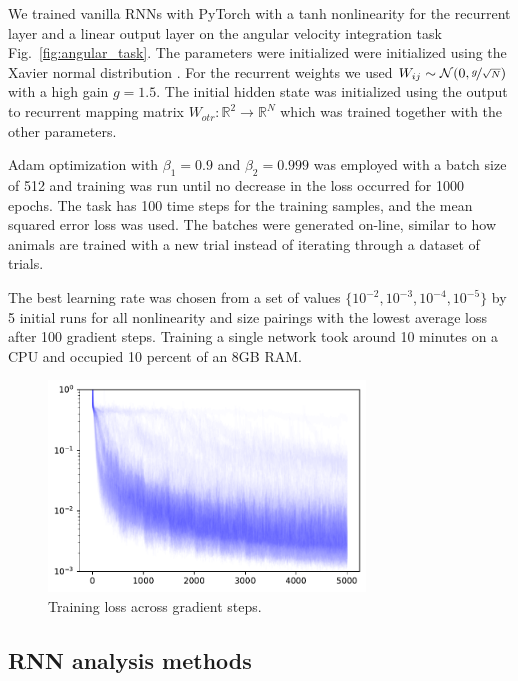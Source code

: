 \documentclass{article} %
\newcounter{ct}
\newcommand{\reals}{\mathbb{R}}
\theoremstyle{definition}
\theoremstyle{remark}
\begin{document}
 We trained vanilla RNNs with PyTorch \citep{paszke2017automatic} with a tanh nonlinearity for the recurrent layer and a linear output layer on the angular velocity integration task Fig.~\ref{fig:angular_task}.
The parameters were initialized were initialized using the Xavier normal distribution \citep{Glorot2010}.
For the recurrent weights we used \(W_{ij}\sim\mathcal{N}(0, \nicefrac{g}{\sqrt{N}})\) with a high gain \(g=1.5\).
The initial hidden state was initialized using the output to recurrent mapping matrix \(W_{otr}\colon\reals^2\rightarrow\reals^{N}\) which was trained together with the other parameters.

Adam optimization with \(\beta_1=0.9\) and \(\beta_2=0.999\) was employed with a batch size of 512 and training was run until no decrease in the loss occurred for 1000 epochs.
The task has 100 time steps for the training samples, and the mean squared error loss was used.
The batches were generated on-line, similar to how animals are trained with a new trial instead of iterating through a dataset of trials.


The best learning rate was chosen from a set of values \(\{10^{-2},10^{-3},10^{-4},10^{-5}\}\) by 5 initial runs for all nonlinearity and size pairings with the lowest average loss after 100 gradient steps.
Training a single network took around 10 minutes on a CPU and occupied 10 percent of an 8GB RAM.


 \begin{figure}[tbhp]
     \centering
    \includegraphics[width=0.75\textwidth]{training_losses}
       \caption{Training loss across gradient steps.}\label{fig:training_losses}
\end{figure}






\newpage
 \subsection{RNN analysis methods}
\end{document}
